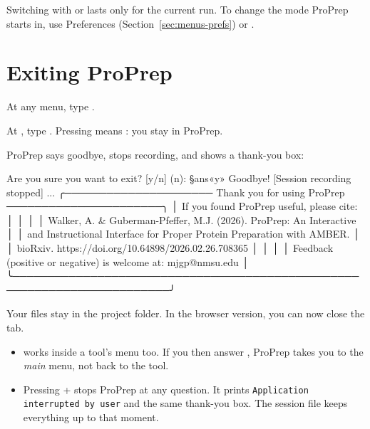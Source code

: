 Switching with  or  lasts only for the current run. To change the
mode ProPrep starts in, use Preferences (Section~\ref{sec:menus-prefs}) or
.

\section{Exiting ProPrep}\label{sec:starting-exit}

\begin{steps}
  \item At any menu, type .
  \item At , type .
  Pressing  means : you stay in ProPrep.
\end{steps}

ProPrep says goodbye, stops recording, and shows a thank-you box:

\begin{screen}
Are you sure you want to exit? [y/n] (n): §ans«y»
Goodbye!
[Session recording stopped]
...
╭───────────────────── Thank you for using ProPrep ──────────────────────╮
│ If you found ProPrep useful, please cite:                              │
│                                                                        │
│ Walker, A. & Guberman-Pfeffer, M.J. (2026). ProPrep: An Interactive    │
│ and Instructional Interface for Proper Protein Preparation with AMBER. │
│ bioRxiv. https://doi.org/10.64898/2026.02.26.708365                    │
│                                                                        │
│ Feedback (positive or negative) is welcome at: mjgp@nmsu.edu           │
╰────────────────────────────────────────────────────────────────────────╯
\end{screen}

Your files stay in the project folder. In the browser version, you can now
close the tab.

\begin{itemize}
  \item {} works inside a tool's menu too. If you then answer ,
  ProPrep takes you to the \emph{main} menu, not back to the tool.
  \item Pressing + stops ProPrep at any question. It prints
  \texttt{Application interrupted by user} and the same thank-you box. The
  session file keeps everything up to that moment.
\end{itemize}

